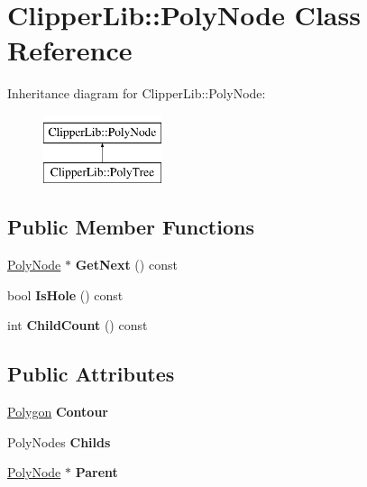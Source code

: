 \hypertarget{classClipperLib_1_1PolyNode}{\section{Clipper\-Lib\-:\-:Poly\-Node Class Reference}
\label{classClipperLib_1_1PolyNode}
}
Inheritance diagram for Clipper\-Lib\-:\-:Poly\-Node\-:\begin{figure}[H]
\begin{center}
\leavevmode
\includegraphics[height=2.000000cm]{classClipperLib_1_1PolyNode}
\end{center}
\end{figure}
\subsection*{Public Member Functions}
\begin{DoxyCompactItemize}
\item 
\hypertarget{classClipperLib_1_1PolyNode_ae9a4f50a1c9aec06c083578742d24bb7}{\hyperlink{classClipperLib_1_1PolyNode}{Poly\-Node} $\ast$ {\bfseries Get\-Next} () const }\label{classClipperLib_1_1PolyNode_ae9a4f50a1c9aec06c083578742d24bb7}

\item 
\hypertarget{classClipperLib_1_1PolyNode_aef7847f53087207b6e341c029adc1768}{bool {\bfseries Is\-Hole} () const }\label{classClipperLib_1_1PolyNode_aef7847f53087207b6e341c029adc1768}

\item 
\hypertarget{classClipperLib_1_1PolyNode_a76c8c55a45651cf3b5a67b8634173de8}{int {\bfseries Child\-Count} () const }\label{classClipperLib_1_1PolyNode_a76c8c55a45651cf3b5a67b8634173de8}

\end{DoxyCompactItemize}
\subsection*{Public Attributes}
\begin{DoxyCompactItemize}
\item 
\hypertarget{classClipperLib_1_1PolyNode_acb497b5e354eedbb5aa29531a1a57714}{\hyperlink{classPolygon}{Polygon} {\bfseries Contour}}\label{classClipperLib_1_1PolyNode_acb497b5e354eedbb5aa29531a1a57714}

\item 
\hypertarget{classClipperLib_1_1PolyNode_a7ac59aea508951a4c979bfca8913261d}{Poly\-Nodes {\bfseries Childs}}\label{classClipperLib_1_1PolyNode_a7ac59aea508951a4c979bfca8913261d}

\item 
\hypertarget{classClipperLib_1_1PolyNode_a9465bc02623316de2af3ab52c6f7041e}{\hyperlink{classClipperLib_1_1PolyNode}{Poly\-Node} $\ast$ {\bfseries Parent}}\label{classClipperLib_1_1PolyNode_a9465bc02623316de2af3ab52c6f7041e}

\end{DoxyCompactItemize}
